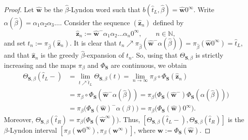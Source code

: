 \documentclass[11pt]{amsart}
\theoremstyle{definition}
\theoremstyle{remark}
\numberwithin{equation}{section}
\newcommand{\N}{\ensuremath{\mathbb{N}}}
\renewcommand{\L}{\ensuremath{\mathbb{L}}}
\newcommand{\cs}{ {\mathbf{S}}}
\newcommand{\w}{\mathbf{w}}
\newcommand{\z}{\mathbf{z}}
\newcommand{\f}{\infty}
\newcommand{\lle}{\preccurlyeq}
\begin{document}
\begin{proof}
Let $\hat{\w}$ be the $\hat{\beta}$-Lyndon word such that $b(\hat{t}_L,\hat{\beta})=\hat{\w}0^\f$. Write $\alpha(\hat{\beta})=\alpha_1\alpha_2\alpha_3\dots$. Consider the sequence $(\hat{\z}_n)$ defined by
\[
\hat{\z}_n:=\hat{\w}^-\alpha_1\alpha_2\dots\alpha_n 0^\f, \qquad n\in\N,
\]
and set $t_n:=\pi_{\hat\beta}(\hat{\z}_n)$. It is clear that $t_n\nearrow \pi_{\hat\beta}(\hat{\w}^-\alpha(\hat{\beta}))=\pi_{\hat\beta}(\hat{\w}0^\f)=\hat{t}_L$, and that $\hat{\z}_n$ is the greedy $\hat{\beta}$-expansion of $t_n$. So, using that $\Theta_{\cs,\beta}$ is strictly increasing and the maps $\pi_\beta$ and $\Phi_\cs$ are continuous, we obtain
\begin{align*}
\Theta_{\cs,\beta}(\hat{t}_L-)&=\lim_{t\nearrow \hat{t}_L} \Theta_{\cs,\beta}(t)=\lim_{n\to\infty} \pi_\beta\circ\Phi_\cs(\hat{\z}_n)\\
&=\pi_\beta\circ\Phi_\cs(\hat{\w}^-\alpha(\hat{\beta}))=\pi_\beta\big(\Phi_\cs(\hat{\w}^-)\Phi_\cs(\alpha(\hat{\beta}))\big)\\
&=\pi_\beta\big(\Phi_\cs(\hat{\w})^-\alpha(\beta)\big)=\pi_\beta\big(\Phi_\cs(\hat{\w})0^\f\big).
\end{align*}
Moreover, $\Theta_{\cs,\beta}(\hat{t}_R)=\pi_\beta\big(\Phi_\cs(\hat{\w}^\f)\big)$. Thus, $[\Theta_{\cs,\beta}(\hat{t}_L-),\Theta_{\cs,\beta}(\hat{t}_R)]$ is the $\beta$-Lyndon interval $[\pi_\beta(\w 0^\f),\pi_\beta(\w^\f)]$, where $\w:=\Phi_\cs(\hat{\w})$. %
\end{proof}
\end{document}

